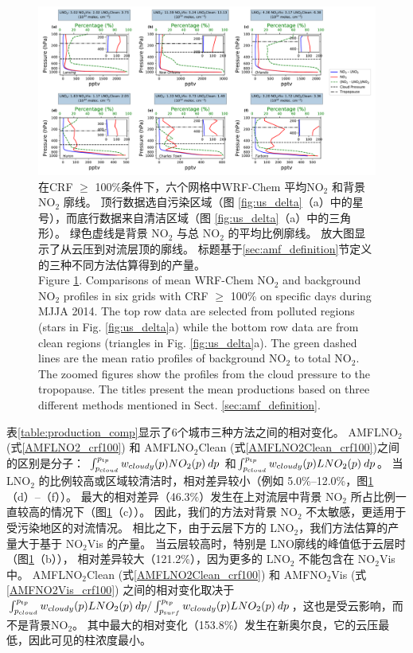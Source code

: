 \begin{figure}[!htbp]
\includegraphics[width=15cm]{./figures/us_bkgd_comp.pdf}
\caption{在CRF $\geq$ 100\%条件下，六个网格中WRF-Chem 平均NO$_\textrm{2}$ 和背景 NO$_\textrm{2}$ 廓线。
顶行数据选自污染区域（图 \ref{fig:us_delta}（a）中的星号），而底行数据来自清洁区域（图 \ref{fig:us_delta}（a）中的三角形）。
绿色虚线是背景 NO$_\textrm{2}$ 与总 NO$_\textrm{2}$ 的平均比例廓线。
放大图显示了从云压到对流层顶的廓线。
标题基于\ref{sec:amf_definition}节定义的三种不同方法估算得到的产量。\\
Figure \ref{fig:us_bkgd_comp}. Comparisons of mean WRF-Chem NO$_\textrm{2}$ and background NO$_\textrm{2}$ profiles in six grids with CRF $\geq$ 100\% on specific days during MJJA 2014.
The top row data are selected from polluted regions (stars in Fig. \ref{fig:us_delta}a) while the bottom row data are from clean regions (triangles in Fig. \ref{fig:us_delta}a).
The green dashed lines are the mean ratio profiles of background NO$_\textrm{2}$ to total NO$_\textrm{2}$.
The zoomed figures show the profiles from the cloud pressure to the tropopause.
The titles present the mean productions based on three different methods mentioned in Sect. \ref{sec:amf_definition}.}
\label{fig:us_bkgd_comp}
\end{figure}


表\ref{table:production_comp}显示了6个城市三种方法之间的相对变化。
AMFLNO$_2$ (式\ref{AMFLNO2_crf100}) 和 AMFLNO$_2$Clean (式\ref{AMFLNO2Clean_crf100})之间的区别是分子：
$\int_{p_{\textrm cloud}}^{p_{\textrm tp}} w_{\textrm cloudy}(p) NO_2(p) \: dp$
和$\int_{p_{\textrm cloud}}^{p_{\textrm tp}} w_{\textrm cloudy}(p) LNO_2(p) \: dp$。
当 LNO$_2$ 的比例较高或区域较清洁时，相对差异较小（例如 5.0\%--12.0\%，图\ref{fig:us_bkgd_comp}（d）--（f））。
最大的相对差异（46.3\%）发生在上对流层中背景 NO$_2$ 所占比例一直较高的情况下（图\ref{fig:us_bkgd_comp}（c））。
因此，我们的方法对背景 NO$_2$ 不太敏感，更适用于受污染地区的对流情况。
相比之下，由于云层下方的 LNO$_2$，我们方法估算的产量大于基于 NO$_2$Vis 的产量。
当云层较高时，特别是 LNO廓线的峰值低于云层时（图\ref{fig:us_bkgd_comp}（b）），
相对差异较大（121.2\%），因为更多的 LNO$_2$ 不能包含在 NO$_2$Vis 中。
AMFLNO$_2$Clean (式\ref{AMFLNO2Clean_crf100}) 和 AMFNO$_2$Vis (式\ref{AMFNO2Vis_crf100}) 之间的相对变化取决于
$\int_{p_{\textrm cloud}}^{p_{\textrm tp}} w_{\textrm cloudy}(p) LNO_2(p) \: dp / \int_{p_{\textrm surf}}^{p_{\textrm tp}} w_{\textrm cloudy}(p) LNO_2(p) \: dp$，这也是受云影响，而不是背景NO$_2$。
其中最大的相对变化（153.8\%）发生在新奥尔良，它的云压最低，因此可见的柱浓度最小。


